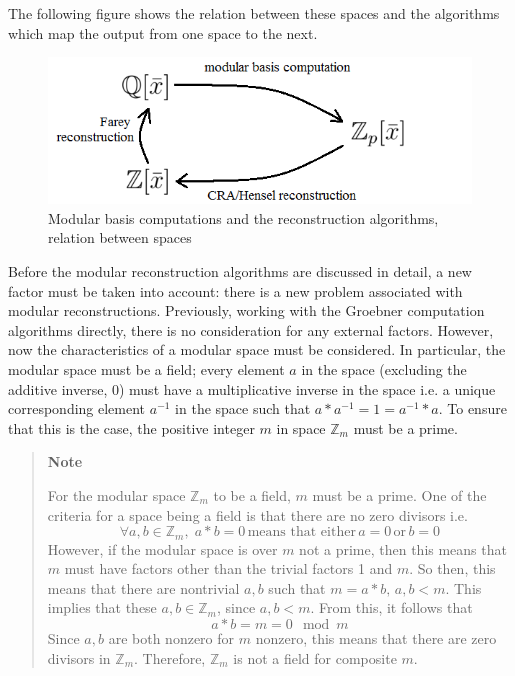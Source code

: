 \documentclass[letterpaper,12pt,titlepage,oneside,final]{book}
\newcounter{notecounter}
\newenvironment{note}{\begin{quote}%
    \refstepcounter{notecounter}%
  \textbf{Note \arabic{notecounter}}%
  \quad
}{%
\end{quote}%
}
\begin{document}
The following figure shows the relation between these spaces and the algorithms which map the output from one space to the next.

\begin{figure}[H]
  \centering
  \includegraphics[scale=0.7]{reconstructionRelations.png}
  \caption{Modular basis computations and the reconstruction algorithms, relation between spaces \label{fig:bb_tests}}
\end{figure}

Before the modular reconstruction algorithms are discussed in detail, a new factor must be taken into account: there is a new problem associated with modular reconstructions.  Previously, working with the Groebner computation algorithms directly, there is no consideration for any external factors.  However, now the characteristics of a modular space must be considered.  In particular, the modular space must be a field; every element ${a}$ in the space (excluding the additive inverse, 0) must have a multiplicative inverse in the space i.e. a unique corresponding element ${a^{-1}}$ in the space such that ${a*a^{-1} = 1 = a^{-1}*a}$.  To ensure that this is the case, the positive integer ${m}$ in space ${\mathbb{Z}_m}$ must be a prime.

\begin{note}
  For the modular space ${\mathbb{Z}_m}$ to be a field, ${m}$ must be a prime.  One of the criteria for a space being a field is that there are no zero divisors i.e. 
  \begin{equation*}  \forall a, b \in \mathbb{Z}_m,\; a*b = 0 \, \textrm{means that either} \, a = 0 \, \textrm{or} \, b = 0 \end{equation*}
  However, if the modular space is over ${m}$ not a prime, then this means that ${m}$ must have factors other than the trivial factors 1 and ${m}$.  So then, this means that there are nontrivial ${a, b}$ such that ${m = a*b, \, a, b < m}$.   This implies that these ${a, b \in \mathbb{Z}_m}$, since ${a, b < m}$.  From this, it follows that 
  \begin{equation*} a*b = m = 0 \mod m \end{equation*}
  Since ${a, b}$ are both nonzero for ${m}$ nonzero, this means that there are zero divisors in ${\mathbb{Z}_m}$.  Therefore, ${\mathbb{Z}_m}$ is not a field for composite ${m}$.
\end{note}
\end{document}
